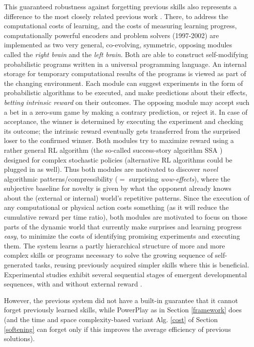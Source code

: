 \documentclass{article}
\begin{document}
This guaranteed
robustness against forgetting previous skills also represents a difference to the most closely related
 previous work \cite{Schmidhuber:99cec,Schmidhuber:02predictable}.
There, to address the computational costs of learning, and the costs of measuring learning progress,
computationally powerful encoders and problem solvers 
 \cite{Schmidhuber:97interesting,Schmidhuber:02predictable}  (1997-2002) are implemented 
as two very general, co-evolving, symmetric, opposing modules called the {\em right brain}
and the {\em left brain}. Both are able to construct self-modifying
probabilistic programs written in a universal programming language.
An internal storage for temporary computational results
of the programs is viewed as part of the changing environment.
Each module can suggest experiments 
in the form of probabilistic algorithms to be executed,
and make predictions about their effects, 
{\em betting intrinsic reward}  on their outcomes.
The opposing module may accept such a bet in a zero-sum game by making a 
contrary prediction, or reject it. In case of acceptance,
the winner is determined by executing the experiment and 
checking its outcome;
the intrinsic reward eventually gets transferred from the surprised loser to the 
confirmed winner.  
Both modules try to maximize reward using
a rather general RL algorithm (the so-called success-story algorithm SSA  \cite{Schmidhuber:97bias}) 
designed for  complex stochastic policies (alternative
RL algorithms could be plugged in as well).
Thus both modules are motivated to discover {\em novel} algorithmic
patterns/compressibility ($=$ surprising {\em wow-effects}), where the subjective baseline
for novelty is given by what the opponent already knows about
the (external or internal) world's repetitive patterns.
Since the execution of any computational or physical action
costs something (as it will reduce the cumulative reward per time ratio), both modules
are motivated to focus on those parts of the dynamic
world that currently make surprises and learning progress {\em easy}, to minimize
the costs of identifying promising experiments and executing them.
The system learns a  partly hierarchical structure of more and more complex 
skills or programs necessary to solve the growing sequence of self-generated tasks,
reusing previously acquired simpler skills where this is beneficial.
Experimental studies exhibit
several sequential stages of
emergent developmental sequences, with and without external
reward \cite{Schmidhuber:99cec,Schmidhuber:02predictable}.

However, the previous system \cite{Schmidhuber:99cec,Schmidhuber:02predictable} 
did not have a built-in guarantee that it cannot forget previously learned skills,
while {\sc PowerPlay} as in Section \ref{framework} does (and the time and space complexity-based  variant Alg. \ref{cost} of Section \ref{softening} 
can forget only if this improves the average efficiency of
previous solutions).
\end{document}
